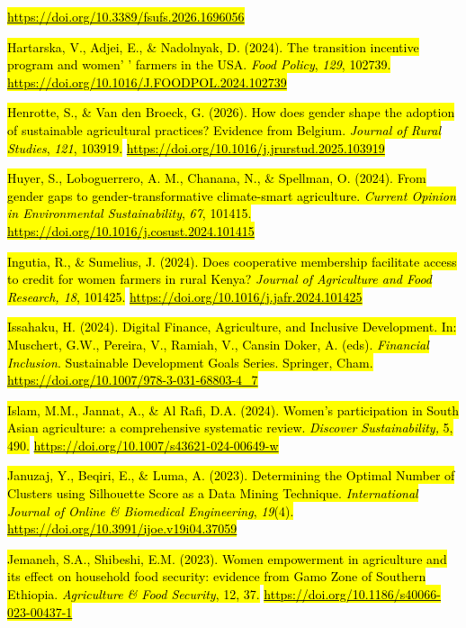 \documentclass[
]{article}
\begin{document}
\href{https://doi.org/10.3389/fsufs.2026.1696056}{\hl{https://doi.org/10.3389/fsufs.2026.1696056}}

\hl{Hartarska, V., Adjei, E., \& Nadolnyak, D. (2024). The transition
incentive program and women' ' farmers in the USA. \emph{Food Policy},
\emph{129}, 102739.}
\href{https://doi.org/10.1016/J.FOODPOL.2024.102739}{\hl{https://doi.org/10.1016/J.FOODPOL.2024.102739}}

\hl{Henrotte, S., \& Van den Broeck, G. (2026). How does gender shape
the adoption of sustainable agricultural practices? Evidence from
Belgium. \emph{Journal of Rural Studies}, \emph{121}, 103919.}
\href{https://doi.org/10.1016/j.jrurstud.2025.103919}{\hl{https://doi.org/10.1016/j.jrurstud.2025.103919}}

\hl{Huyer, S., Loboguerrero, A. M., Chanana, N., \& Spellman, O. (2024).
From gender gaps to gender-transformative climate-smart agriculture.
\emph{Current Opinion in Environmental Sustainability}, \emph{67},
101415.}
\href{https://doi.org/10.1016/j.cosust.2024.101415}{\hl{https://doi.org/10.1016/j.cosust.2024.101415}}

\hl{Ingutia, R., \& Sumelius, J. (2024). Does cooperative membership
facilitate access to credit for women farmers in rural Kenya?
\emph{Journal of Agriculture and Food Research, 18}, 101425.}
\href{https://doi.org/10.1016/j.jafr.2024.101425}{\hl{https://doi.org/10.1016/j.jafr.2024.101425}}

\hl{Issahaku, H. (2024). Digital Finance, Agriculture, and Inclusive
Development. In: Muschert, G.W., Pereira, V., Ramiah, V., Cansin Doker,
A. (eds). \emph{Financial Inclusion}. Sustainable Development Goals
Series. Springer, Cham.}
\href{https://doi.org/10.1007/978-3-031-68803-4_7}{\hl{https://doi.org/10.1007/978-3-031-68803-4\_7}}

\hl{Islam, M.M., Jannat, A., \& Al Rafi, D.A. (2024). Women's
participation in South Asian agriculture: a comprehensive systematic
review. \emph{Discover Sustainability,} 5, 490.}
\href{https://doi.org/10.1007/s43621-024-00649-w}{\hl{https://doi.org/10.1007/s43621-024-00649-w}}

\hl{Januzaj, Y., Beqiri, E., \& Luma, A. (2023). Determining the Optimal
Number of Clusters using Silhouette Score as a Data Mining Technique.
\emph{International Journal of Online \& Biomedical Engineering},
\emph{19}(4).}
\href{https://doi.org/10.3991/ijoe.v19i04.37059}{\hl{https://doi.org/10.3991/ijoe.v19i04.37059}}

\hl{Jemaneh, S.A., Shibeshi, E.M. (2023). Women empowerment in
agriculture and its effect on household food security: evidence from
Gamo Zone of Southern Ethiopia. \emph{Agriculture \& Food Security}, 12,
37.}
\href{https://doi.org/10.1186/s40066-023-00437-1}{\hl{https://doi.org/10.1186/s40066-023-00437-1}}
\end{document}
